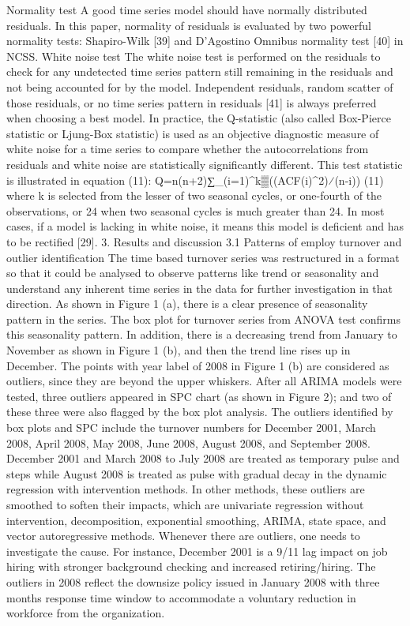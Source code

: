 	Normality test
A good time series model should have normally distributed residuals. In this paper, normality of residuals is evaluated by two powerful normality tests: Shapiro-Wilk [39] and D'Agostino Omnibus normality test [40] in NCSS. 
	White noise test
The white noise test is performed on the residuals to check for any undetected time series pattern still remaining in the residuals and not being accounted for by the model. Independent residuals, random scatter of those residuals, or no time series pattern in residuals [41] is always preferred when choosing a best model. In practice, the Q-statistic (also called Box-Pierce statistic or Ljung-Box statistic) is used as an objective diagnostic measure of white noise for a time series to compare whether the autocorrelations from residuals and white noise are statistically significantly different. This test statistic is illustrated in equation (11): 
                                                    Q=n(n+2)∑_(i=1)^k▒((ACF(i)^2)⁄(n-i))                                  (11)
where k is selected from the lesser of two seasonal cycles, or one-fourth of the observations, or 24 when two seasonal cycles is much greater than 24. In most cases, if a model is lacking in white noise, it means this model is deficient and has to be rectified [29]. 
3.    Results and discussion
3.1   Patterns of employ turnover and outlier identification
The time based turnover series was restructured in a format so that it could be analysed to observe patterns like trend or seasonality and understand any inherent time series in the data for further investigation in that direction. As shown in Figure 1 (a), there is a clear presence of seasonality pattern in the series. The box plot for turnover series from ANOVA test confirms this seasonality pattern. In addition, there is a decreasing trend from January to November as shown in Figure 1 (b), and then the trend line rises up in December. The points with year label of 2008 in Figure 1 (b) are considered as outliers, since they are beyond the upper whiskers. After all ARIMA models were tested, three outliers appeared in SPC chart (as shown in Figure 2); and two of these three were also flagged by the box plot analysis. The outliers identified by box plots and SPC include the turnover numbers for December 2001, March 2008, April 2008, May 2008, June 2008, August 2008, and September 2008. December 2001 and March 2008 to July 2008 are treated as temporary pulse and steps while August 2008 is treated as pulse with gradual decay in the dynamic regression with intervention methods. In other methods, these outliers are smoothed to soften their impacts, which are univariate regression without intervention, decomposition, exponential smoothing, ARIMA, state space, and vector autoregressive methods. Whenever there are outliers, one needs to investigate the cause. For instance, December 2001 is a 9/11 lag impact on job hiring with stronger background checking and increased retiring/hiring. The outliers in 2008 reflect the downsize policy issued in January 2008 with three months response time window to accommodate a voluntary reduction in workforce from the organization. 
 

